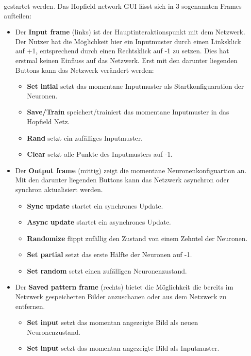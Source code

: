 \noindent gestartet werden. Das Hopfield network GUI lässt sich in 3 sogenannten Frames aufteilen:
\begin{itemize}
\item Der \textbf{Input frame} (links) ist der Hauptinteraktionspunkt mit dem Netzwerk. Der Nutzer hat die Möglichkeit hier ein Inputmuster durch einen Linksklick auf +1, entsprechend durch einen Rechtsklick auf -1 zu setzen. Dies hat erstmal keinen Einfluss auf das Netzwerk. Erst mit den darunter liegenden Buttons kann das Netzwerk verändert werden:
\begin{itemize}
\item \textbf{Set intial} setzt das momentane Inputmuster als Startkonfiguaration der Neuronen.
\item \textbf{Save/Train} speichert/trainiert das momentane Inputmuster in das Hopfield Netz.
\item \textbf{Rand} setzt ein zufälliges Inputmuster.
\item \textbf{Clear} setzt alle Punkte des Inputmusters auf -1.
\end{itemize}
\item Der \textbf{Output frame} (mittig) zeigt die momentane Neuronenkonfiguartion an. Mit den darunter liegenden Buttons kann das Netzwerk asynchron oder synchron aktualisiert werden.
\begin{itemize}
\item \textbf{Sync update} startet ein synchrones Update.
\item \textbf{Async update} startet ein asynchrones Update.
\item \textbf{Randomize} flippt zufällig den Zustand von einem Zehntel der Neuronen.
\item \textbf{Set partial} setzt das erste Hälfte der Neuronen auf -1.
\item \textbf{Set random} setzt einen zufälligen Neuronenzustand.
\end{itemize}
\item Der \textbf{Saved pattern frame} (rechts) bietet die Möglichkeit die bereits im Netzwerk gespeicherten Bilder anzuschauen oder aus dem Netzwerk zu entfernen.
\begin{itemize}
\item \textbf{Set input} setzt das momentan angezeigte Bild als neuen Neuronenzustand.
\item \textbf{Set input} setzt das momentan angezeigte Bild als Inputmuster.
\end{itemize}
\end{itemize}
